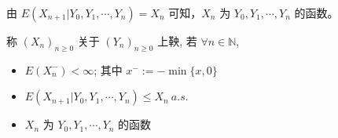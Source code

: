 \documentclass[lang=cn,10pt,thmcnt=section]{elegantbook}
\begin{document}
\begin{remark}
	由 $E(X_{n+1} | Y_0, Y_1, \cdots, Y_n) = X_n$ 可知，$X_n$ 为 $Y_0, Y_1, \cdots, Y_n$ 的函数。
\end{remark}
\begin{definition}[上鞅]
	称 $(X_n)_{n \geq 0}$ 关于 $(Y_n)_{n \geq 0}$ 上鞅, 若 $\forall n \in \mathbb{N}$,
\begin{itemize}
    \item $E(X_n^-) < \infty$; 其中 $x^- := -\min\{x, 0\}$
    \item $E(X_{n+1} | Y_0, Y_1, \cdots, Y_n) \leq X_n \ a.s.$
    \item $X_n$ 为 $Y_0, Y_1, \cdots, Y_n$ 的函数
\end{itemize}
\end{definition}
\end{document}
